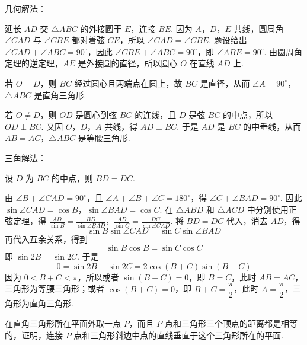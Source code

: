 \begin{solution}
几何解法：


延长 \(AD\) 交 \(\triangle ABC\) 的外接圆于 \(E\)，连接 \(BE\). 因为 \(A\)，\(D\)，\(E\) 共线，圆周角 \(\angle CAD\) 与 \(\angle CBE\) 都对着弦 \(CE\)，所以
\(\angle CAD=\angle CBE\). 题设给出 \(\angle CAD+\angle ABC=90^\circ\)，因此
\(\angle CBE+\angle ABC=90^\circ\)，即 \(\angle ABE=90^\circ\). 由圆周角定理的逆定理，\(AE\) 是外接圆的直径，所以圆心 \(O\) 在直线 \(AD\) 上.

若 \(O=D\)，则 \(BC\) 经过圆心且两端点在圆上，故 \(BC\) 是直径，从而 \(\angle A=90^\circ\)，\(\triangle ABC\) 是直角三角形.

若 \(O\ne D\)，则 \(OD\) 是圆心到弦 \(BC\) 的连线，且 \(D\) 是弦 \(BC\) 的中点，所以 \(OD\perp BC\). 又因 \(O\)，\(D\)，\(A\) 共线，得 \(AD\perp BC\). 于是 \(AD\) 是 \(BC\) 的中垂线，从而 \(AB=AC\)，\(\triangle ABC\) 是等腰三角形.

三角解法：

设 \(D\) 为 \(BC\) 的中点，则 \(BD=DC\).


由 \(\angle B+\angle CAD=90^\circ\)，且 \(\angle A+\angle B+\angle C=180^\circ\)，得 \(\angle C+\angle BAD=90^\circ\). 因此
\(\sin\angle CAD=\cos B\)，\(\sin\angle BAD=\cos C\).
在 \(\triangle ABD\) 和 \(\triangle ACD\) 中分别使用正弦定理，得
\(\frac{AD}{\sin B}=\frac{BD}{\sin\angle BAD}\)，\(\frac{AD}{\sin C}=\frac{DC}{\sin\angle CAD}\).
将 \(BD=DC\) 代入，消去 \(AD\)，得
\[
\sin B\sin\angle CAD=\sin C\sin\angle BAD
\]
再代入互余关系，得到
\[
\sin B\cos B=\sin C\cos C
\]
即 \(\sin 2B=\sin 2C\). 于是
\[
0=\sin 2B-\sin 2C=2\cos(B+C)\sin(B-C)
\]
因为 \(0<B+C<\pi\)，所以或者 \(\sin(B-C)=0\)，即 \(B=C\)，此时 \(AB=AC\)，三角形为等腰三角形；或者 \(\cos(B+C)=0\)，即 \(B+C=\dfrac{\pi}{2}\)，此时 \(A=\dfrac{\pi}{2}\)，三角形为直角三角形.
\end{solution}

\begin{problem}
在直角三角形所在平面外取一点 \(P\)，而且 \(P\) 点和三角形三个顶点的距离都是相等的，证明，连接 \(P\) 点和三角形斜边中点的直线垂直于这个三角形所在的平面.
\end{problem}

